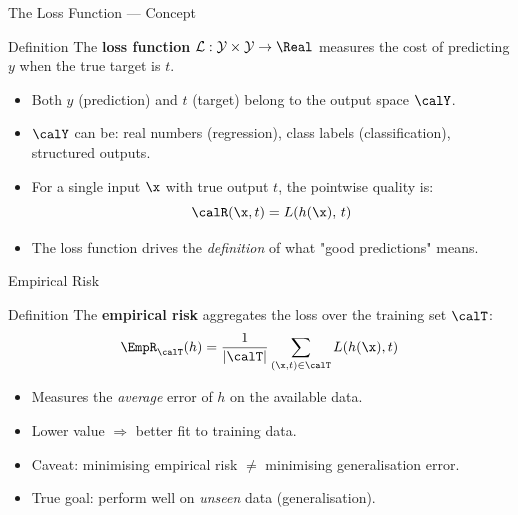 \begin{frame}{The Loss Function — Concept}
  \begin{block}{Definition}
    The \textbf{loss function} $\mathcal{L}:\mathcal{Y}\times\mathcal{Y}\to\Real$
    measures the \alert{cost} of predicting $y$ when the true target is $t$.
  \end{block}

  \vspace{.5em}
  \begin{itemize}
    \item Both $y$ (prediction) and $t$ (target) belong to the output space $\calY$.
    \item $\calY$ can be: real numbers (regression), class labels (classification), structured outputs.
    \item For a single input $\x$ with true output $t$, the pointwise quality is:
      \[
        \calR(\x, t) = L\!\left(h(\x),\, t\right)
      \]
    \item The loss function drives the \emph{definition} of what "good predictions" means.
  \end{itemize}
\end{frame}

\begin{frame}{Empirical Risk}
  \begin{block}{Definition}
    The \textbf{empirical risk} aggregates the loss over the training set $\calT$:
    \[
      \EmpR_{\calT}(h)
      = \frac{1}{|\calT|}\sum_{(\x,t)\in\calT} L\!\left(h(\x), t\right)
    \]
  \end{block}

  \vspace{.5em}
  \begin{itemize}
    \item Measures the \emph{average} error of $h$ on the available data.
    \item Lower value $\Rightarrow$ better fit to training data.
    \item \alert{Caveat}: minimising empirical risk $\neq$ minimising generalisation error.
    \item True goal: perform well on \emph{unseen} data (generalisation).
  \end{itemize}
\end{frame}

